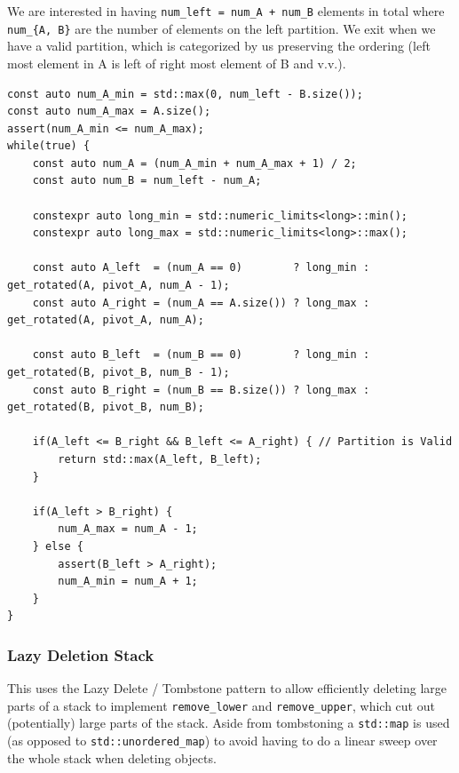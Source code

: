\documentclass{article}
\begin{document}
We are interested in having \texttt{num\_left = num\_A + num\_B} elements in total where \texttt{num\_\{A, B\}} are the number of elements on the left partition. We exit when we have a valid partition, which is categorized by us preserving the ordering (left most element in A is left of right most element of B and v.v.).
\begin{lstlisting}
const auto num_A_min = std::max(0, num_left - B.size());
const auto num_A_max = A.size();
assert(num_A_min <= num_A_max);
while(true) {
    const auto num_A = (num_A_min + num_A_max + 1) / 2;
    const auto num_B = num_left - num_A;

    constexpr auto long_min = std::numeric_limits<long>::min();
    constexpr auto long_max = std::numeric_limits<long>::max();

    const auto A_left  = (num_A == 0)        ? long_min : get_rotated(A, pivot_A, num_A - 1);
    const auto A_right = (num_A == A.size()) ? long_max : get_rotated(A, pivot_A, num_A);

    const auto B_left  = (num_B == 0)        ? long_min : get_rotated(B, pivot_B, num_B - 1);
    const auto B_right = (num_B == B.size()) ? long_max : get_rotated(B, pivot_B, num_B);

    if(A_left <= B_right && B_left <= A_right) { // Partition is Valid
        return std::max(A_left, B_left);
    }

    if(A_left > B_right) {
        num_A_max = num_A - 1;
    } else {
        assert(B_left > A_right);
        num_A_min = num_A + 1;
    }
}
\end{lstlisting}

\subsubsection{Lazy Deletion Stack}
This uses the Lazy Delete / Tombstone pattern to allow efficiently deleting large parts of a stack to implement \texttt{remove\_lower} and \texttt{remove\_upper}, which cut out (potentially) large parts of the stack. Aside from tombstoning a \texttt{std::map} is used (as opposed to \texttt{std::unordered\_map}) to avoid having to do a linear sweep over the whole stack when deleting objects.
\end{document}
